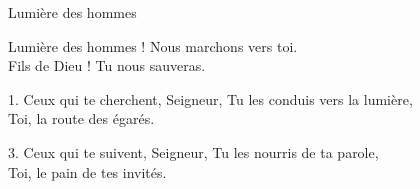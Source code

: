 Lumière des hommes

Lumière des hommes ! Nous marchons vers toi.\\
Fils de Dieu ! Tu nous sauveras.

1. Ceux qui te cherchent, Seigneur, Tu les conduis vers la lumière,\\
Toi, la route des égarés.

3. Ceux qui te suivent, Seigneur, Tu les nourris de ta parole,\\
Toi, le pain de tes invités.


